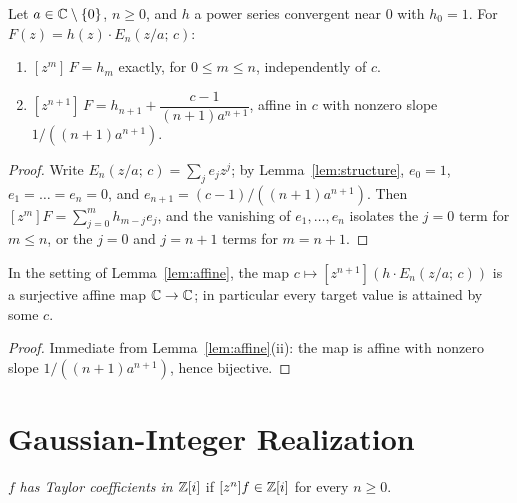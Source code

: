 \begin{lemma}
  \label{lem:affine}
  \leanok
  Let $a \in \mathbb{C} \setminus \{0\}$, $n \ge 0$, and $h$ a power series
  convergent near $0$ with $h_0 = 1$. For $F(z) = h(z)\cdot
  E_n(z/a;\,c)$:
  \begin{enumerate}
    \item[(i)] $[z^m]\,F = h_m$ exactly, for $0 \le m \le n$,
      independently of $c$.
    \item[(ii)] $[z^{n+1}]\,F = h_{n+1} + \dfrac{c-1}{(n+1)a^{n+1}}$,
      affine in $c$ with nonzero slope $1/((n+1)a^{n+1})$.
  \end{enumerate}
\end{lemma}
\begin{proof}
  \leanok
  Write $E_n(z/a;\,c) = \sum_j e_j z^j$; by Lemma~\ref{lem:structure},
  $e_0 = 1$, $e_1 = \dots = e_n = 0$, and
  $e_{n+1} = (c-1)/((n+1)a^{n+1})$. Then $[z^m]F = \sum_{j=0}^m
  h_{m-j}e_j$, and the vanishing of $e_1, \dots, e_n$ isolates the $j=0$
  term for $m \le n$, or the $j=0$ and $j=n+1$ terms for $m=n+1$.
\end{proof}

\begin{lemma}
  \label{rem:triangular}
  \leanok
  In the setting of Lemma~\ref{lem:affine}, the map $c \mapsto
  [z^{n+1}](h\cdot E_n(z/a;\,c))$ is a surjective affine map $\mathbb{C} \to \mathbb{C}$;
  in particular every target value is attained by some $c$.
\end{lemma}
\begin{proof}
  \leanok
  Immediate from Lemma~\ref{lem:affine}(ii): the map is affine with
  nonzero slope $1/((n+1)a^{n+1})$, hence bijective.
\end{proof}

\chapter{Gaussian-Integer Realization}
\label{chap:propZi}

\begin{definition}
  \label{def:hasGaussianIntCoeffs}
  \leanok
  $f$ \emph{has Taylor coefficients in $\mathbb{Z}[i]$} if $[z^n]f \in \mathbb{Z}[i]$ for
  every $n \ge 0$.
\end{definition}

